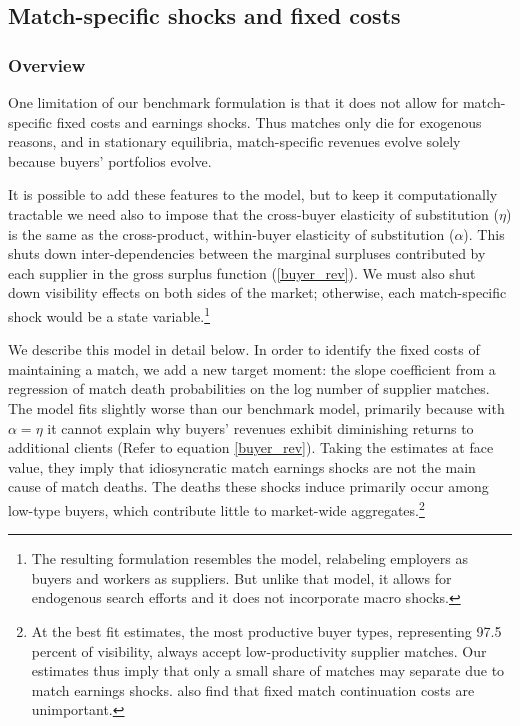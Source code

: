 \documentclass[12pt]{article} \usepackage{amsmath,amssymb,amsthm,geometry,graphicx,setspace,algorithm,algpseudocode,float}
\begin{document}
\subsection{Match-specific shocks and fixed costs}
\label{sec:AltModelMP}

\subsubsection{Overview}

One limitation of our benchmark formulation is that it does not allow for match-specific fixed costs and earnings shocks. Thus matches only die for exogenous reasons, and in stationary equilibria, match-specific revenues evolve solely because buyers' portfolios evolve. 
\par
It is possible to add these features to the model, but to keep it computationally tractable we need also to impose that the cross-buyer elasticity of substitution ($\eta$) is the same as the cross-product, within-buyer elasticity of substitution ($\alpha$). This shuts down inter-dependencies between the marginal surpluses contributed by each supplier in the gross surplus function (\ref{buyer_rev}). 
 We must also shut down visibility effects on both sides of the market; otherwise, each match-specific shock would be a state variable.\footnote{\label{footnote:MP} The resulting formulation resembles the \citet{MortensenPissarides1994} model, relabeling employers as buyers and workers as suppliers. But unlike that model, it allows for endogenous search efforts and it does not incorporate macro shocks.\medskip} 
\par
We describe this model in detail below. In order to identify the fixed costs of maintaining a match, we add a new target moment: the slope coefficient from a regression of match death probabilities on the log number of supplier matches.  The model fits slightly worse than our benchmark model, primarily because with $\alpha=\eta$ it cannot explain why buyers' revenues exhibit diminishing returns to additional clients (Refer to equation \ref{buyer_rev}). Taking the estimates at face value, they imply that idiosyncratic match earnings shocks are not the main cause of match deaths. The deaths these shocks induce primarily occur among low-type buyers, which contribute little to market-wide aggregates.\footnote{At the best fit estimates, the most productive buyer types, representing 97.5 percent of visibility, always accept low-productivity supplier matches.  Our estimates thus imply that only a small share of matches may separate due to match earnings shocks.  \citet{eaton2014a} also find that fixed match continuation costs are unimportant.\medskip}
\end{document}
